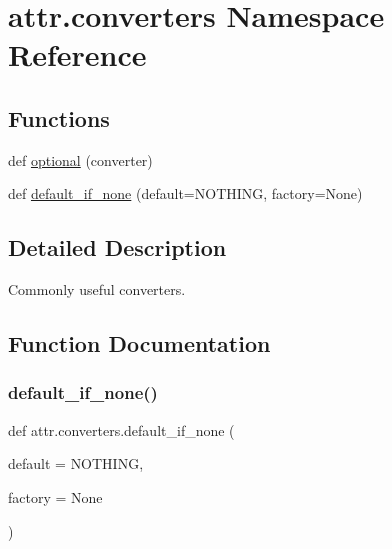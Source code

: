 \hypertarget{namespaceattr_1_1converters}{}\section{attr.\+converters Namespace Reference}
\label{namespaceattr_1_1converters}
\subsection*{Functions}
\begin{DoxyCompactItemize}
\item 
def \hyperlink{namespaceattr_1_1converters_a9573ca901d271a4af620f1d12ee9c63c}{optional} (converter)
\item 
def \hyperlink{namespaceattr_1_1converters_aa708a6d8d7f55febe6e6c9635adc06e5}{default\+\_\+if\+\_\+none} (default=N\+O\+T\+H\+I\+NG, factory=None)
\end{DoxyCompactItemize}


\subsection{Detailed Description}
\begin{DoxyVerb}Commonly useful converters.
\end{DoxyVerb}
 

\subsection{Function Documentation}
\mbox{\label{namespaceattr_1_1converters_aa708a6d8d7f55febe6e6c9635adc06e5}} 
\subsubsection{\texorpdfstring{default\+\_\+if\+\_\+none()}{default\_if\_none()}}
{\footnotesize\ttfamily def attr.\+converters.\+default\+\_\+if\+\_\+none (\begin{DoxyParamCaption}\item[{}]{default = {\ttfamily NOTHING},  }\item[{}]{factory = {\ttfamily None} }\end{DoxyParamCaption})}

